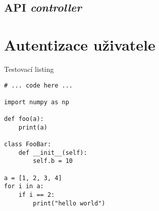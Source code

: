 \subsection{API \textit{controller}}


\section{Autentizace uživatele}
\label{sec:im_auth}






\begin{listing}[htbp]
\caption{\label{code:foo} Testovací listing}
\begin{verbatim}
# ... code here ...

import numpy as np

def foo(a):
    print(a)

class FooBar:
    def __init__(self):
        self.b = 10

a = [1, 2, 3, 4]
for i in a:
    if i == 2:
        print("hello world")
\end{verbatim}
\end{listing}